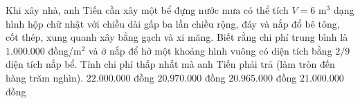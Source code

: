 \begin{ex}%
	Khi xây nhà, anh Tiến cần xây một bể đựng nước mưa có thể tích $V=6$ m$^3$ dạng hình hộp chữ nhật với chiều dài gấp ba lần chiều rộng, đáy và nắp đổ bê tông, cốt thép, xung quanh xây bằng gạch và xi măng. Biết rằng chi phí trung bình là $1.000.000$ đồng/m$^2$ và ở nắp để hở một khoảng hình vuông có diện tích bằng $2/9$ diện tích nắp bể. Tính chi phí thấp nhất mà anh Tiến phải trả (làm tròn đến hàng trăm nghìn).
	\choice
	{$22.000.000$ đồng}
	{$20.970.000$ đồng}
	{\True $20.965.000$ đồng}
	{$21.000.000$ đồng}
\end{ex}
